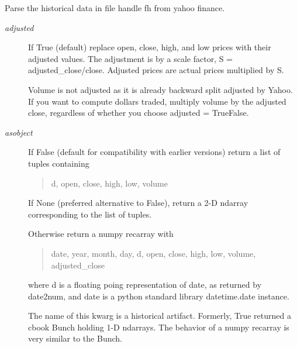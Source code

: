 \documentclass[letterpaper,10pt,english]{sphinxmanual}
\begin{document}
\begin{fulllineitems}
\label{newfinance:newfinance.parse_yahoo_historical}
Parse the historical data in file handle fh from yahoo finance.
\begin{description}
\item[{\emph{adjusted}}] \leavevmode
If True (default) replace open, close, high, and low prices with
their adjusted values. The adjustment is by a scale factor, S =
adjusted\_close/close. Adjusted prices are actual prices
multiplied by S.

Volume is not adjusted as it is already backward split adjusted
by Yahoo. If you want to compute dollars traded, multiply volume
by the adjusted close, regardless of whether you choose adjusted
= True\textbar{}False.

\item[{\emph{asobject}}] \leavevmode
If False (default for compatibility with earlier versions)
return a list of tuples containing
\begin{quote}

d, open, close, high, low, volume
\end{quote}

If None (preferred alternative to False), return
a 2-D ndarray corresponding to the list of tuples.

Otherwise return a numpy recarray with
\begin{quote}

date, year, month, day, d, open, close, high, low,
volume, adjusted\_close
\end{quote}

where d is a floating poing representation of date,
as returned by date2num, and date is a python standard
library datetime.date instance.

The name of this kwarg is a historical artifact.  Formerly,
True returned a cbook Bunch
holding 1-D ndarrays.  The behavior of a numpy recarray is
very similar to the Bunch.

\end{description}

\end{fulllineitems}

\end{document}
